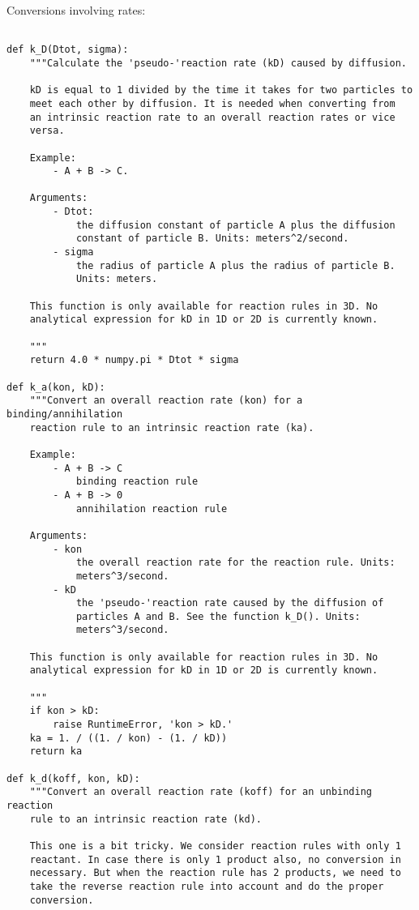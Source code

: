 \documentclass[a4paper,10pt]{article}
\begin{document}
Conversions involving rates:
\begin{verbatim}

def k_D(Dtot, sigma):
    """Calculate the 'pseudo-'reaction rate (kD) caused by diffusion.
    
    kD is equal to 1 divided by the time it takes for two particles to 
    meet each other by diffusion. It is needed when converting from 
    an intrinsic reaction rate to an overall reaction rates or vice 
    versa.

    Example:
        - A + B -> C.

    Arguments:
        - Dtot:
            the diffusion constant of particle A plus the diffusion 
            constant of particle B. Units: meters^2/second.
        - sigma
            the radius of particle A plus the radius of particle B. 
            Units: meters.

    This function is only available for reaction rules in 3D. No 
    analytical expression for kD in 1D or 2D is currently known. 

    """
    return 4.0 * numpy.pi * Dtot * sigma

def k_a(kon, kD):
    """Convert an overall reaction rate (kon) for a binding/annihilation 
    reaction rule to an intrinsic reaction rate (ka).

    Example:
        - A + B -> C
            binding reaction rule
        - A + B -> 0
            annihilation reaction rule

    Arguments:
        - kon
            the overall reaction rate for the reaction rule. Units: 
            meters^3/second.
        - kD
            the 'pseudo-'reaction rate caused by the diffusion of 
            particles A and B. See the function k_D(). Units: 
            meters^3/second.

    This function is only available for reaction rules in 3D. No 
    analytical expression for kD in 1D or 2D is currently known. 

    """
    if kon > kD:
        raise RuntimeError, 'kon > kD.'
    ka = 1. / ((1. / kon) - (1. / kD))
    return ka

def k_d(koff, kon, kD):
    """Convert an overall reaction rate (koff) for an unbinding reaction 
    rule to an intrinsic reaction rate (kd).

    This one is a bit tricky. We consider reaction rules with only 1 
    reactant. In case there is only 1 product also, no conversion in 
    necessary. But when the reaction rule has 2 products, we need to 
    take the reverse reaction rule into account and do the proper 
    conversion.


\end{verbatim}
\end{document}
